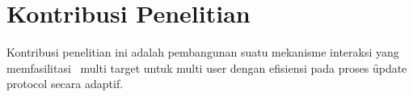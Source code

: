 
\section{Kontribusi Penelitian}

Kontribusi penelitian ini adalah pembangunan suatu mekanisme interaksi yang
memfasilitasi \tracking~multi target untuk multi user dengan efisiensi pada
proses \f{update protocol} secara adaptif.

